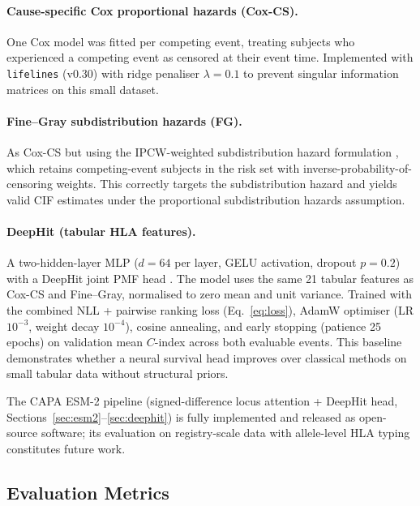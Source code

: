 \documentclass[11pt,a4paper]{article}
\begin{document}
\paragraph{Cause-specific Cox proportional hazards (Cox-CS).}
One Cox model \citep{cox1972regression} was fitted per competing event, treating
subjects who experienced a competing event as censored at their event time.
Implemented with \texttt{lifelines} (v0.30) \citep{davidson2019lifelines} with
ridge penaliser $\lambda=0.1$ to prevent singular information matrices on this
small dataset.

\paragraph{Fine--Gray subdistribution hazards (FG).}
As Cox-CS but using the IPCW-weighted subdistribution hazard formulation
\citep{fine1999subdistribution, geskus2011ipcw}, which retains competing-event
subjects in the risk set with inverse-probability-of-censoring weights.  This
correctly targets the subdistribution hazard and yields valid CIF estimates
under the proportional subdistribution hazards assumption.

\paragraph{DeepHit (tabular HLA features).}
A two-hidden-layer MLP ($d=64$ per layer, GELU activation, dropout $p=0.2$)
with a DeepHit joint PMF head \citep{lee2018deephit}.  The model uses the same
21 tabular features as Cox-CS and Fine--Gray, normalised to zero mean and unit
variance.  Trained with the combined NLL + pairwise ranking loss (Eq.~\ref{eq:loss}),
AdamW optimiser (LR $10^{-3}$, weight decay $10^{-4}$), cosine annealing, and
early stopping (patience 25 epochs) on validation mean $C$-index across both
evaluable events.  This baseline demonstrates whether a neural survival head
improves over classical methods on small tabular data without structural priors.

The CAPA ESM-2 pipeline (signed-difference locus attention + DeepHit head, Sections~\ref{sec:esm2}--\ref{sec:deephit})
is fully implemented and released as open-source software; its evaluation on
registry-scale data with allele-level HLA typing constitutes future work.

\subsection{Evaluation Metrics}
\label{sec:metrics}
\end{document}
